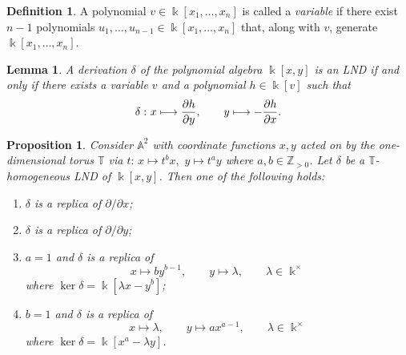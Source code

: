 \documentclass[a4paper,reqno,12pt]{amsart}
\theoremstyle{plain}
\newtheorem{proposition}[theorem]{Proposition}
\theoremstyle{definition}
\newtheorem{definition}[theorem]{Definition}
\theoremstyle{plain}
\newtheorem{lemma}[theorem]{Lemma}
\theoremstyle{remark}
\newcommand{\TT}{\mathbb{T}}
\newcommand{\lmt}{\longmapsto}
\begin{document}
\begin{definition}
    A polynomial $v\in\Bbbk[x_1,\ldots,x_n]$ is called a \emph{variable} if there exist $n-1$ polynomials $u_1,\ldots,u_{n-1}\in \Bbbk[x_1,\ldots,x_n]$ that, along with $v$, generate $\Bbbk[x_1,\ldots,x_n]$.
\end{definition}
\begin{lemma}\emph{\cite[Corollary~4.6]{Freu}}\label{A^2-Lemma}
    A derivation $\delta$ of the polynomial algebra $\Bbbk[x,y]$ is an LND if and only if there exists a variable $v$ and a polynomial $h\in\Bbbk[v]$ such that $$\delta\,\colon x\longmapsto {\partial h\over\partial y},\qquad y\longmapsto-{\partial h\over\partial x}.$$
\end{lemma}
\begin{proposition}\label{PropHom-A^2}
    Consider $\mathbb A^2$ with coordinate functions $x, y$ acted on by the one-dimensional torus ${\TT}$ via $t\colon\, x\longmapsto t^b x,\,\,y\longmapsto t^a y$ where $a, b\in\mathbb Z_{>0}$. Let $\delta$ be a ${\TT}$-homogeneous LND of $\Bbbk[x,y]$. Then one of the following holds:
    \begin{enumerate}
        \item [$(i)$] $\delta$ is a replica of ${\partial/\partial x}$;
        \item [$(ii)$] $\delta$ is a replica of ${\partial/\partial y}$; 
        \item[$(iii)$] $a=1$ and $\delta$ is a replica of $$x\lmt by^{b-1},\qquad  y\lmt\lambda,\qquad \lambda\in\Bbbk^{\times}$$ where  $\ker\delta=\Bbbk[\lambda x-y^{b}]$;
        \item[$(iv)$] $b=1$ and $\delta$ is a replica of  $$x\lmt \lambda,\qquad y\lmt ax^{a-1}, \qquad \lambda\in\Bbbk^{\times}$$ where $\ker\delta=\Bbbk[ x^{a}-\lambda y]$.
    \end{enumerate}
\end{proposition}
\end{document}
